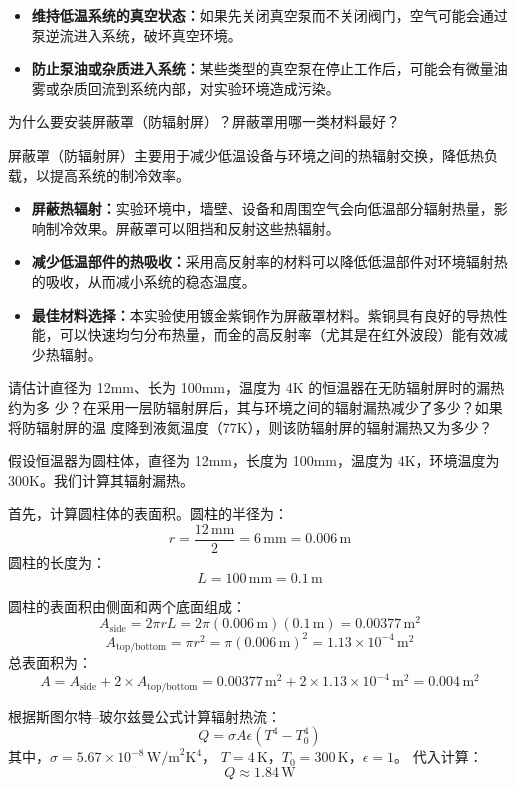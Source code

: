 \begin{itemize}
    \item \textbf{维持低温系统的真空状态：}如果先关闭真空泵而不关闭阀门，空气可能会通过泵逆流进入系统，破坏真空环境。
    \item \textbf{防止泵油或杂质进入系统：}某些类型的真空泵在停止工作后，可能会有微量油雾或杂质回流到系统内部，对实验环境造成污染。
\end{itemize}

\begin{question}
    为什么要安装屏蔽罩（防辐射屏）？屏蔽罩用哪一类材料最好？
\end{question}
屏蔽罩（防辐射屏）主要用于减少低温设备与环境之间的热辐射交换，降低热负载，以提高系统的制冷效率。

\begin{itemize}
    \item \textbf{屏蔽热辐射：}实验环境中，墙壁、设备和周围空气会向低温部分辐射热量，影响制冷效果。屏蔽罩可以阻挡和反射这些热辐射。
    \item \textbf{减少低温部件的热吸收：}采用高反射率的材料可以降低低温部件对环境辐射热的吸收，从而减小系统的稳态温度。
    \item \textbf{最佳材料选择：}本实验使用镀金紫铜作为屏蔽罩材料。紫铜具有良好的导热性能，可以快速均匀分布热量，而金的高反射率（尤其是在红外波段）能有效减少热辐射。
\end{itemize}
\begin{question}
    请估计直径为 12mm、长为 100mm，温度为 4K 的恒温器在无防辐射屏时的漏热约为多
少？在采用一层防辐射屏后，其与环境之间的辐射漏热减少了多少？如果将防辐射屏的温
度降到液氮温度（77K），则该防辐射屏的辐射漏热又为多少？
\end{question}

假设恒温器为圆柱体，直径为 12mm，长度为 100mm，温度为 4K，环境温度为 300K。我们计算其辐射漏热。

首先，计算圆柱体的表面积。圆柱的半径为：
\[
r = \frac{12\,\text{mm}}{2} = 6\,\text{mm} = 0.006\,\text{m}
\]
圆柱的长度为：
\[
L = 100\,\text{mm} = 0.1\,\text{m}
\]

圆柱的表面积由侧面和两个底面组成：
\[
A_{\text{side}} = 2\pi r L = 2\pi(0.006\,\text{m})(0.1\,\text{m}) = 0.00377\,\text{m}^2
\]
\[
A_{\text{top/bottom}} = \pi r^2 = \pi(0.006\,\text{m})^2 = 1.13 \times 10^{-4}\,\text{m}^2
\]
总表面积为：
\[
A = A_{\text{side}} + 2 \times A_{\text{top/bottom}} = 0.00377\,\text{m}^2 + 2 \times 1.13 \times 10^{-4}\,\text{m}^2 = 0.004\,\text{m}^2
\]

根据斯图尔特–玻尔兹曼公式计算辐射热流：
\[
Q = \sigma A \epsilon (T^4 - T_0^4)
\]
其中，\(\sigma = 5.67 \times 10^{-8}\,\text{W/m}^2\text{K}^4\)，
\(T = 4\,\text{K}\)，\(T_0 = 300\,\text{K}\)，\(\epsilon = 1\)。
代入计算：
\[
Q \approx 1.84\,\text{W}
\]


